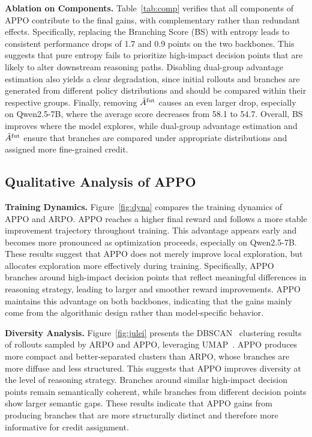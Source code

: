 \documentclass{llmxive}
\begin{document}
\noindent\textbf{Ablation on Components.} 
Table~\ref{tab:comp} verifies that all components of APPO contribute to the final gains, with complementary rather than redundant effects. Specifically, replacing the Branching Score (BS) with entropy leads to consistent performance drops of 1.7  and 0.9 points on the two backbones. This suggests that pure entropy fails to prioritize high-impact decision points that are likely to alter downstream reasoning paths. Disabling dual-group advantage estimation also yields a clear degradation, since initial rollouts and branches are generated from different policy distributions and should be compared within their respective groups. Finally, removing $\hat{A}^{\rm fut}$ causes an even larger drop, especially on Qwen2.5-7B, where the average score decreases from 58.1 to 54.7. Overall, BS improves where the model explores, while dual-group advantage estimation and $\hat{A}^{\rm fut}$ ensure that branches are compared under appropriate distributions and assigned more fine-grained credit.
\vspace{-0.3cm}
\subsection{Qualitative Analysis of APPO}

\noindent\textbf{Training Dynamics.} 
Figure~\ref{fig:dyna} compares the training dynamics of APPO and ARPO. 
APPO reaches a higher final reward and follows a more stable improvement trajectory throughout training. 
This advantage appears early and becomes more pronounced as optimization proceeds, especially on Qwen2.5-7B. 
These results suggest that APPO does not merely improve local exploration, but allocates exploration more effectively during training. 
Specifically, APPO branches around high-impact decision points that reflect meaningful differences in reasoning strategy, leading to larger and smoother reward improvements. 
APPO maintains this advantage on both backbones, indicating that the gains mainly come from the algorithmic design rather than model-specific behavior. 

\noindent\textbf{Diversity Analysis.} 
Figure~\ref{fig:julei} presents the DBSCAN~\cite{ester1996density} clustering results of rollouts sampled by ARPO and APPO, leveraging UMAP~\cite{mcinnes2018umap}. 
APPO produces more compact and better-separated clusters than ARPO, whose branches are more diffuse and less structured. 
This suggests that APPO improves diversity at the level of reasoning strategy. 
Branches around similar high-impact decision points remain semantically coherent, while branches from different decision points show larger semantic gaps.  These results indicate that APPO gains from producing branches that are more structurally distinct and therefore more informative for credit assignment.
\end{document}
